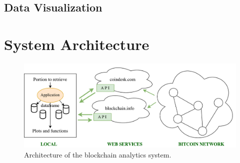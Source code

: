 \documentclass[USenglish]{uit-thesis}
\begin{document}
\subsection{Data Visualization}
\label{sec:datavisualization}


\section{System Architecture}
\label{sec:implementation}

\begin{figure}[h]
	\centering
	\includegraphics[width=1\textwidth]{img/architecture}
	\caption{Architecture of the blockchain analytics system.}
	\label{fig:architecture}
\end{figure}


\end{document}
